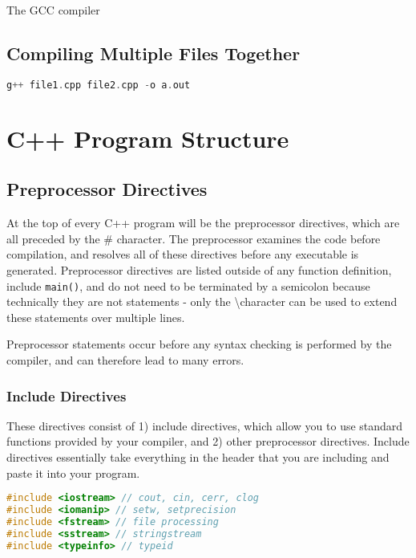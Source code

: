 \documentclass[10pt]{article}
\begin{document}
The GCC compiler

\subsection{Compiling Multiple Files Together}

\begin{lstlisting}[language=C++]
g++ file1.cpp file2.cpp -o a.out
\end{lstlisting}

\section{C++ Program Structure}

\subsection{Preprocessor Directives}

At the top of every C++ program will be the preprocessor directives, which are all preceded by the \# character. The preprocessor examines the code before compilation, and resolves all of these directives before any executable is generated. Preprocessor directives are listed outside of any function definition, include \texttt{main()}, and do not need to be terminated by a semicolon because technically they are not statements - only the \textbackslash character can be used to extend these statements over multiple lines.

Preprocessor statements occur before any syntax checking is performed by the compiler, and can therefore lead to many errors. 

\subsubsection{Include Directives}

These directives consist of 1) include directives, which allow you to use standard functions provided by your compiler, and 2) other preprocessor directives. Include directives essentially take everything in the header that you are including and paste it into your program. 

\begin{lstlisting}[language=C++]
#include <iostream> // cout, cin, cerr, clog
#include <iomanip> // setw, setprecision
#include <fstream> // file processing
#include <sstream> // stringstream
#include <typeinfo> // typeid
\end{lstlisting}
\end{document}
